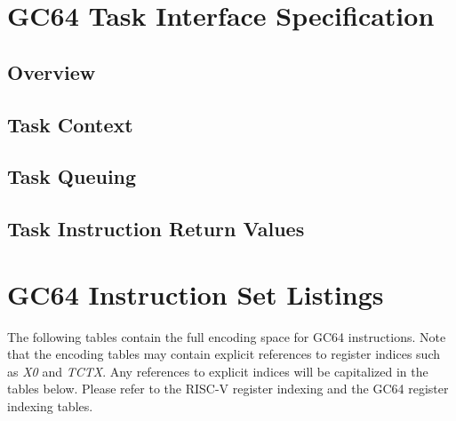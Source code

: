 \documentclass{article}
\begin{document}
\section{GC64 Task Interface Specification}

\subsection{Overview}

\subsection{Task Context}

\subsection{Task Queuing}

\subsection{Task Instruction Return Values}

\section{GC64 Instruction Set Listings}

The following tables contain the full encoding space for GC64 instructions. 
Note that the encoding tables may contain explicit references to register
indices such as \emph{X0} and \emph{TCTX}.  Any references to explicit indices
will be capitalized in the tables below.  Please refer to the RISC-V register
indexing and the GC64 register indexing tables.
\end{document}

